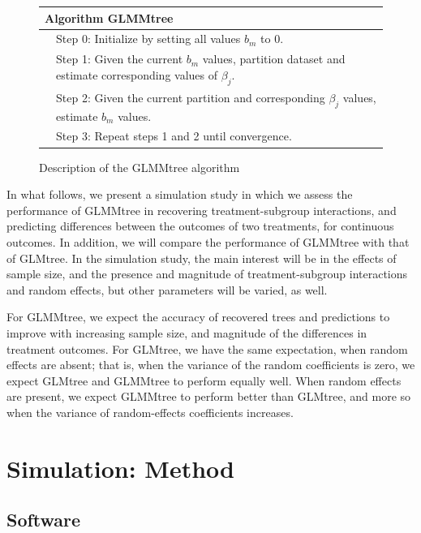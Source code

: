 \documentclass[nobf,doc]{apa}
\begin{document}
\begin{figure}[!htbp]
	\begin{tabular}{ll}
		\hline 
		\multicolumn{2}{l}{\textbf{Algorithm} GLMMtree}\\
		\hline
		&Step 0: Initialize by setting all values $b_m$ to $0$.\\

		&Step 1: Given the current $b_m$ values, partition dataset and estimate corresponding values of $\beta_j$.\\
	
		&Step 2: Given the current partition and corresponding $\beta_j$ values, estimate $b_m$ values. \\
	
		&Step 3: Repeat steps 1 and 2 until convergence.\\
		\hline
	\end{tabular}
	\caption{Description of the GLMMtree algorithm}
	\label{fig:algorithm}
\end{figure}

In what follows, we present a simulation study in which we assess the performance of GLMMtree in recovering treatment-subgroup interactions, and predicting differences between the outcomes of two treatments, for continuous outcomes. In addition, we will compare the performance of GLMMtree with that of GLMtree. In the simulation study, the main interest will be in the effects of sample size, and the presence and magnitude of treatment-subgroup interactions and random effects, but other parameters will be varied, as well. 

For GLMMtree, we expect the accuracy of recovered trees and predictions to improve with increasing sample size, and magnitude of the differences in treatment outcomes. For GLMtree, we have the same expectation, when random effects are absent; that is, when the variance of the random coefficients is zero, we expect GLMtree and GLMMtree to perform equally well. When random effects are present, we expect GLMMtree to perform better than GLMtree, and more so when the variance of random-effects coefficients increases.



\section{Simulation: Method}

\subsection{Software}
\end{document}
